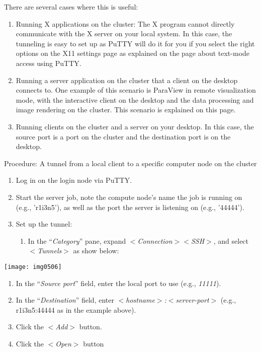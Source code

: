 There are several cases where this is useful:

\begin{enumerate}
\item  Running X applications on the cluster: The X program cannot directly
  communicate with the X server on your local system. In this case, the
  tunneling is easy to set up as PuTTY will do it for you if you select the
  right options on the X11 settings page as explained on the page about
  text-mode access using PuTTY.
\item  Running a server application on the cluster that a client on the desktop
  connects to. One example of this scenario is ParaView in remote visualization
  mode, with the interactive client on the desktop and the data processing and
  image rendering on the cluster. This scenario is explained on this page.
\item  Running clients on the cluster and a server on your desktop. In this
  case, the source port is a port on the cluster and the destination port is on
  the desktop.
\end{enumerate}

Procedure: A tunnel from a local client to a specific computer node on the cluster

\begin{enumerate}
  \item  Log in on the login node via PuTTY.
  \item  Start the server job, note the compute node's name the job is running on (e.g., 'r1i3n5'), as well as the port the server is listening on (e.g., '44444').
  \item  Set up the tunnel:

  \begin{enumerate}
    \item  In the ``\emph{Category}'' pane, expand $<$\emph{Connection}$>$$<$\emph{SSH}$>$, and select $<$\emph{Tunnels}$>$ as show below:
  \end{enumerate}
\end{enumerate}

\texttt{[image: img0506]}

\begin{enumerate}
  \item  In the ``\emph{Source port}'' field, enter the local port to use (e.g., \emph{11111}).
  \item  In the ``\emph{Destination}'' field, enter \emph{$<$hostname$>$:$<$server-port$>$} (e.g., r1i3n5:44444 as in the example above).
  \item  Click the $<$\emph{Add}$>$ button.
  \item  Click the $<$\emph{Open}$>$ button
\end{enumerate}

